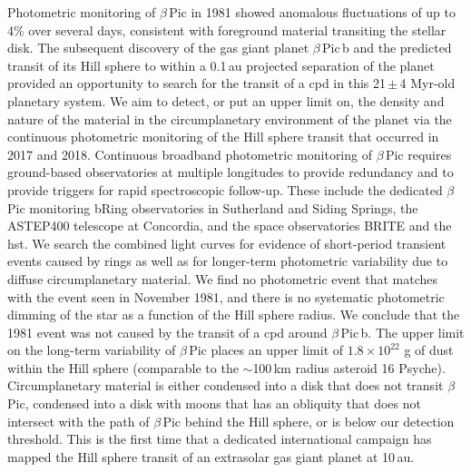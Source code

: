 \documentclass[longauth]{aa} %
\newcommand{\bpb}{$\beta$\,Pic\,b}
\newcommand{\bp}{$\beta$\,Pic}
\begin{document}
  \abstract
  {}%
  {Photometric monitoring of \bp{} in 1981 showed anomalous fluctuations of up to 4\% over several days, consistent with foreground material transiting the stellar disk.
    The subsequent discovery of the gas giant planet \bpb{} and the predicted transit of its Hill sphere to within a 0.1\,au projected separation of the planet provided an opportunity to search for the transit of a \ac{cpd} in this 21\,$\pm$\,4 Myr-old planetary system.
We aim to detect, or put an upper limit on, the density and nature of the material in the circumplanetary environment of the planet via the continuous photometric monitoring of the Hill sphere transit that occurred in 2017 and 2018.
  }
   {Continuous broadband photometric monitoring of \bp{} requires ground-based observatories at multiple longitudes to provide redundancy and to provide triggers for rapid spectroscopic follow-up.
   These include the dedicated \bp{} monitoring bRing observatories in Sutherland and Siding Springs, the ASTEP400 telescope at Concordia, and the space observatories BRITE and the \ac{hst}. We search the combined light curves for evidence of short-period transient events caused by rings as well as for longer-term photometric variability due to diffuse circumplanetary material.}
   {We find no photometric event that matches with the event seen in November 1981, and there is no systematic photometric dimming of the star as a function of the Hill sphere radius.}
   {We conclude that the 1981 event was not caused by the transit of a \ac{cpd} around \bpb{}. The upper limit on the long-term variability of \bp{} places an upper limit of $1.8\times 10^{22}$ g of dust within the Hill sphere (comparable to the $\sim$100\,km radius asteroid 16 Psyche).
   Circumplanetary material is either condensed into a disk that does not transit \bp{}, condensed into a disk with moons that has an obliquity that does not intersect with the path of \bp{} behind the Hill sphere, or is below our detection threshold.
   This is the first time that a dedicated international campaign has mapped the Hill sphere transit of an extrasolar gas giant planet at 10\,au.}
\end{document}
